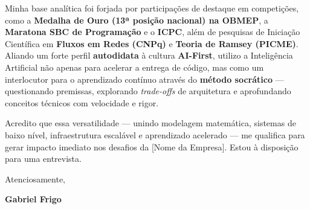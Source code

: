 \documentclass[letterpaper,10pt]{article}
\newcommand{\candidateName}{Gabriel Frigo}
\newcommand{\targetCompany}{[Nome da Empresa]}
\begin{document}
Minha base analítica foi forjada por participações de destaque em competições, como a \textbf{Medalha de Ouro (13ª posição nacional) na OBMEP}, a \textbf{Maratona SBC de Programação} e o \textbf{ICPC}, além de pesquisas de Iniciação Científica em \textbf{Fluxos em Redes (CNPq)} e \textbf{Teoria de Ramsey (PICME)}. Aliando um forte perfil \textbf{autodidata} à cultura \textbf{AI-First}, utilizo a Inteligência Artificial não apenas para acelerar a entrega de código, mas como um interlocutor para o aprendizado contínuo através do \textbf{método socrático} — questionando premissas, explorando \textit{trade-offs} de arquitetura e aprofundando conceitos técnicos com velocidade e rigor.

Acredito que essa versatilidade — unindo modelagem matemática, sistemas de baixo nível, infraestrutura escalável e aprendizado acelerado — me qualifica para gerar impacto imediato nos desafios da \targetCompany. Estou à disposição para uma entrevista.

Atenciosamente,

\textbf{\candidateName}
\end{document}
